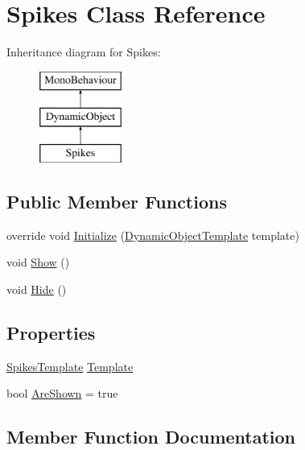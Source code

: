 \hypertarget{class_spikes}{}\section{Spikes Class Reference}
\label{class_spikes}
Inheritance diagram for Spikes\+:\begin{figure}[H]
\begin{center}
\leavevmode
\includegraphics[height=3.000000cm]{class_spikes}
\end{center}
\end{figure}
\subsection*{Public Member Functions}
\begin{DoxyCompactItemize}
\item 
override void \mbox{\hyperlink{class_spikes_a24d8653eda16bb5bdfb56c856c456153}{Initialize}} (\mbox{\hyperlink{class_dynamic_object_template}{Dynamic\+Object\+Template}} template)
\item 
void \mbox{\hyperlink{class_spikes_ac1dc1a9b907505df55cb2c0f01816ba0}{Show}} ()
\item 
void \mbox{\hyperlink{class_spikes_aae2a1b881e86529f8159a80381145508}{Hide}} ()
\end{DoxyCompactItemize}
\subsection*{Properties}
\begin{DoxyCompactItemize}
\item 
\mbox{\hyperlink{class_spikes_template}{Spikes\+Template}} \mbox{\hyperlink{class_spikes_a512fac8ac510d9997be29bd342f9a176}{Template}}
\item 
bool \mbox{\hyperlink{class_spikes_ad4d3a91975a432b636f1abdc2666a01e}{Are\+Shown}} = true
\end{DoxyCompactItemize}


\subsection{Member Function Documentation}
\mbox{\label{class_spikes_aae2a1b881e86529f8159a80381145508}} 
